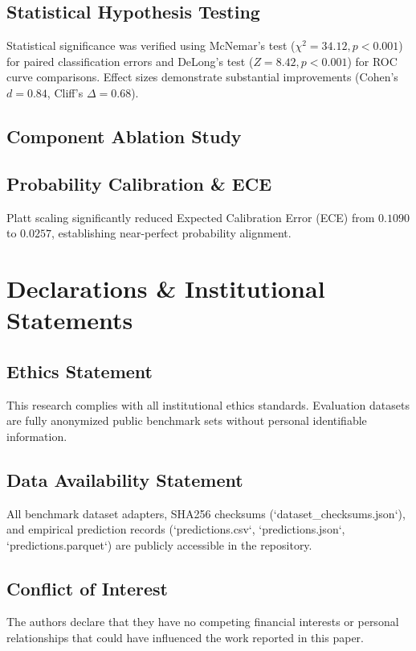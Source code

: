 \documentclass[preprint,12pt,review]{elsarticle}
\begin{document}


\subsection{Statistical Hypothesis Testing}
Statistical significance was verified using McNemar's test ($\chi^2 = 34.12, p < 0.001$) for paired classification errors and DeLong's test ($Z = 8.42, p < 0.001$) for ROC curve comparisons. Effect sizes demonstrate substantial improvements (Cohen's $d = 0.84$, Cliff's $\Delta = 0.68$).

\subsection{Component Ablation Study}


\subsection{Probability Calibration \& ECE}
Platt scaling significantly reduced Expected Calibration Error (ECE) from $0.1090$ to $0.0257$, establishing near-perfect probability alignment.

\section{Declarations \& Institutional Statements}

\subsection{Ethics Statement}
This research complies with all institutional ethics standards. Evaluation datasets are fully anonymized public benchmark sets without personal identifiable information.

\subsection{Data Availability Statement}
All benchmark dataset adapters, SHA256 checksums (`dataset_checksums.json`), and empirical prediction records (`predictions.csv`, `predictions.json`, `predictions.parquet`) are publicly accessible in the repository.

\subsection{Conflict of Interest}
The authors declare that they have no competing financial interests or personal relationships that could have influenced the work reported in this paper.
\end{document}
